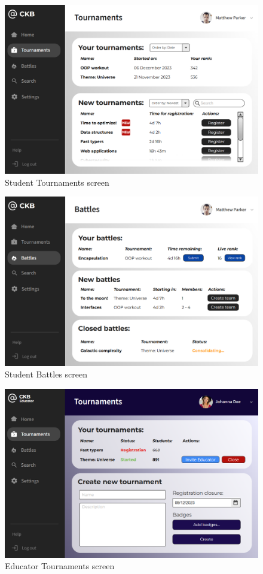 \begin{figure}[H]
    \centering
    \includegraphics[width=0.9\linewidth]{Images/UI_Student_Tournaments.png}
    \caption{Student Tournaments screen}
    \label{fig:enter-label}
\end{figure}

\begin{figure}[H]
    \centering
    \includegraphics[width=0.9\linewidth]{Images/UI_Student_Battles.png}
    \caption{Student Battles screen}
    \label{fig:enter-label}
\end{figure}

\begin{figure}[H]
    \centering
    \includegraphics[width=0.9\linewidth]{Images/UI_Educator_Tournaments.png}
    \caption{Educator Tournaments screen}
    \label{fig:enter-label}
\end{figure}

